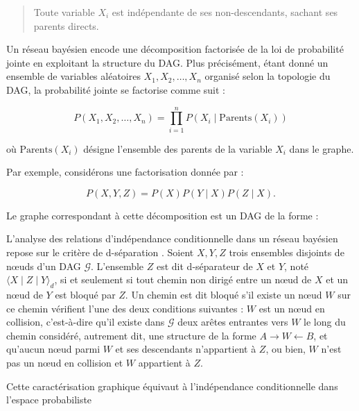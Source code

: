\documentclass{article}
\begin{document}
\begin{quote}
    Toute variable $X_i$ est indépendante de ses non-descendants, sachant ses parents directs.
\end{quote}

Un réseau bayésien encode une décomposition factorisée de la loi de probabilité jointe en exploitant
la structure du DAG. Plus précisément, étant donné un ensemble de variables aléatoires $X_1, X_2, \dots, X_n$
organisé selon la topologie du DAG, la probabilité jointe se factorise comme suit :

$$
    P(X_1, X_2, \dots, X_n) = \prod_{i=1}^{n} P(X_i \mid \text{Parents}(X_i))
$$

où $\text{Parents}(X_i)$ désigne l'ensemble des parents de la variable $X_i$ dans le graphe.

Par exemple, considérons une factorisation donnée par :

$$
    P(X, Y, Z) = P(X) P(Y \mid X) P(Z \mid X).
$$

Le graphe correspondant à cette décomposition est un DAG de la forme :

\begin{center}
\end{center}



L'analyse des relations d'indépendance conditionnelle dans un réseau bayésien repose sur le critère de
d-séparation \cite{10.5555/534975}. Soient $X, Y, Z$ trois ensembles disjoints de nœuds d'un DAG $\mathcal{G}$.
L'ensemble $Z$ est dit d-séparateur de $X$ et $Y$, noté $\langle X \mid Z \mid Y \rangle_d$, si et seulement
si tout chemin non dirigé entre un nœud de $X$ et un nœud de $Y$ est bloqué par $Z$. Un chemin est dit bloqué
s'il existe un nœud $W$ sur ce chemin vérifient l’une des deux conditions suivantes : $W$ est un nœud en collision,
c'est-à-dire qu'il existe dans $\mathcal{G}$ deux arêtes entrantes vers $W$ le long du chemin considéré, autrement dit,
une structure de la forme $A \to W \gets B$, et qu'aucun nœud parmi $W$ et ses descendants n'appartient à $Z$,
ou bien, $W$ n'est pas un nœud en collision et $W$ appartient à $Z$.

Cette caractérisation graphique équivaut à l'indépendance conditionnelle dans l'espace probabiliste
\end{document}
